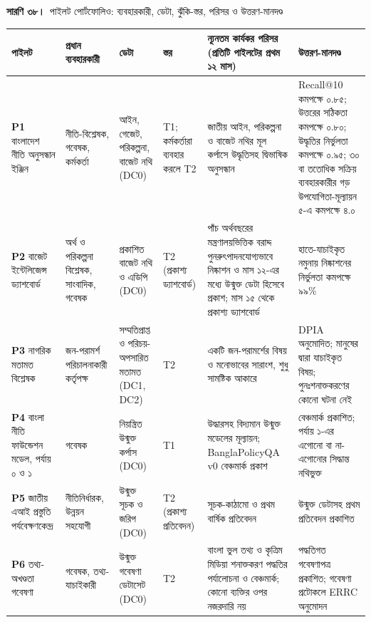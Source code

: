 \documentclass[border=10pt]{standalone}
\begin{document}
\begin{minipage}{22cm}
{\large\bfseries সারণি ৩৮।}\ {\large পাইলট পোর্টফোলিও: ব্যবহারকারী, ডেটা, ঝুঁকি-স্তর, পরিসর ও উত্তরণ-মানদণ্ড}\par\vspace{7pt}
\small
{}
\begin{tabularx}{\linewidth}{@{}>{\hsize=0.981\hsize\raggedright\arraybackslash}X>{\hsize=0.923\hsize\raggedright\arraybackslash}X>{\hsize=0.808\hsize\raggedright\arraybackslash}X>{\hsize=0.519\hsize\raggedright\arraybackslash}X>{\hsize=1.500\hsize\raggedright\arraybackslash}X>{\hsize=1.269\hsize\raggedright\arraybackslash}X@{}}
\arrayrulecolor{bapilrule}\toprule
\rowcolor{white}\textbf{পাইলট} & \textbf{প্রধান ব্যবহারকারী} & \textbf{ডেটা} & \textbf{স্তর} & \textbf{ন্যূনতম কার্যকর পরিসর (প্রতিটি পাইলটের প্রথম ১২ মাস)} & \textbf{উত্তরণ-মানদণ্ড} \\
\midrule
\textbf{P1} বাংলাদেশ নীতি অনুসন্ধান ইঞ্জিন & নীতি-বিশ্লেষক, গবেষক, কর্মকর্তা & আইন, গেজেট, পরিকল্পনা, বাজেট নথি (DC0) & T1; কর্মকর্তারা ব্যবহার করলে T2 & জাতীয় আইন, পরিকল্পনা ও বাজেট নথির মূল কর্পাসে উদ্ধৃতিসহ দ্বিভাষিক অনুসন্ধান & Recall@10 কমপক্ষে ০.৮৫; উত্তরের সঠিকতা কমপক্ষে ০.৮০; উদ্ধৃতির নির্ভুলতা কমপক্ষে ০.৯৫; ৩০ বা ততোধিক সক্রিয় ব্যবহারকারীর গড় উপযোগিতা-মূল্যায়ন ৫-এ কমপক্ষে ৪.০ \\
\textbf{P2} বাজেট ইন্টেলিজেন্স ড্যাশবোর্ড & অর্থ ও পরিকল্পনা বিশ্লেষক, সাংবাদিক, গবেষক & প্রকাশিত বাজেট নথি ও এডিপি (DC0) & T2 (প্রকাশ্য ড্যাশবোর্ড) & পাঁচ অর্থবছরের মন্ত্রণালয়ভিত্তিক বরাদ্দ পুনরুৎপাদনযোগ্যভাবে নিষ্কাশন ও মাস ১২-এর মধ্যে উন্মুক্ত ডেটা হিসেবে প্রকাশ; মাস ১৫ থেকে প্রকাশ্য ড্যাশবোর্ড & হাতে-যাচাইকৃত নমুনায় নিষ্কাশনের নির্ভুলতা কমপক্ষে ৯৯\% \\
\textbf{P3} নাগরিক মতামত বিশ্লেষক & জন-পরামর্শ পরিচালনাকারী কর্তৃপক্ষ & সম্মতিপ্রাপ্ত ও পরিচয়-অপসারিত মতামত (DC1, DC2) & T2 & একটি জন-পরামর্শের বিষয় ও মনোভাবের সারাংশ, শুধু সামষ্টিক আকারে & DPIA অনুমোদিত; মানুষের দ্বারা যাচাইকৃত বিষয়; পুনঃশনাক্তকরণের কোনো ঘটনা নেই \\
\textbf{P4} বাংলা নীতি ফাউন্ডেশন মডেল, পর্যায় ০ ও ১ & গবেষক & নিয়ন্ত্রিত উন্মুক্ত কর্পাস (DC0) & T1 & উদ্ধারসহ বিদ্যমান উন্মুক্ত মডেলের মূল্যায়ন; BanglaPolicyQA v0 বেঞ্চমার্ক প্রকাশ & বেঞ্চমার্ক প্রকাশিত; পর্যায় ১-এর এগোনো বা না-এগোনোর সিদ্ধান্ত নথিভুক্ত \\
\textbf{P5} জাতীয় এআই প্রস্তুতি পর্যবেক্ষণকেন্দ্র & নীতিনির্ধারক, উন্নয়ন সহযোগী & উন্মুক্ত সূচক ও জরিপ (DC0) & T2 (প্রকাশ্য প্রতিবেদন) & সূচক-কাঠামো ও প্রথম বার্ষিক প্রতিবেদন & উন্মুক্ত ডেটাসহ প্রথম প্রতিবেদন প্রকাশিত \\
\textbf{P6} তথ্য-অখণ্ডতা গবেষণা & গবেষক, তথ্য-যাচাইকারী & উন্মুক্ত গবেষণা ডেটাসেট (DC0) & T2 & বাংলা ভুল তথ্য ও কৃত্রিম মিডিয়া শনাক্তকরণ পদ্ধতির পর্যালোচনা ও বেঞ্চমার্ক; কোনো ব্যক্তির ওপর নজরদারি নয় & পদ্ধতিগত গবেষণাপত্র প্রকাশিত; গবেষণা প্রটোকলে ERRC অনুমোদন \\
\bottomrule
\end{tabularx}
\par{}
\end{minipage}
\end{document}
